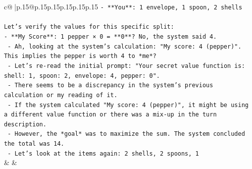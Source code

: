 \documentclass{article}
\begin{document}
{\begin{supertabular}{c@{$\;$}|p{.15\linewidth}@{}p{.15\linewidth}p{.15\linewidth}p{.15\linewidth}p{.15\linewidth}p{.15\linewidth}}
{{{\texttt{{-} **You**: 1 envelope, 1 spoon, 2 shells} \\
\\ 
\texttt{Let's verify the values for this specific split:} \\
\texttt{{-} **My Score**: 1 pepper × 0 = **0**? No, the system said 4.} \\
\texttt{  {-} Ah, looking at the system's calculation: "My score: 4 (pepper)". This implies the pepper is worth 4 to *me*?} \\
\texttt{  {-} Let's re{-}read the initial prompt: "Your secret value function is: shell: 1, spoon: 2, envelope: 4, pepper: 0".} \\
\texttt{  {-} There seems to be a discrepancy in the system's previous calculation or my reading of it.} \\
\texttt{  {-} If the system calculated "My score: 4 (pepper)", it might be using a different value function or there was a mix{-}up in the turn description.} \\
\texttt{  {-} However, the *goal* was to maximize the sum. The system concluded the total was 14.} \\
\texttt{  {-} Let's look at the items again: 2 shells, 2 spoons, 1} \\
            }
        }
    }
    & & \\ \\


\end{supertabular}}
\end{document}
